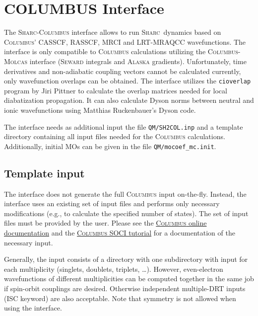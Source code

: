 \documentclass[a4paper,11pt,DIV=15,openany,twoside=false]{scrbook}
\newcommand{\sharc}{\textsc{Sharc}}
\newcommand{\ttt}[1]{\texttt{#1}}
\begin{document}

\section{COLUMBUS Interface}\label{sec:int:columbus}

The \sharc-\textsc{Columbus} interface allows to run \sharc\ dynamics based on \textsc{Columbus}' CASSCF, RASSCF, MRCI and LRT-MRAQCC wavefunctions. The interface is only compatible to \textsc{Columbus} calculations utilizing the \textsc{Columbus}-\textsc{Molcas} interface (\textsc{Seward} integrals and \textsc{Alaska} gradients). Unfortunately, time derivatives and non-adiabatic coupling vectors cannot be calculated currently, only wavefunction overlaps can be obtained. The interface utilizes the \ttt{cioverlap} program by Jiri Pittner \cite{Pittner2009CP} to calculate the overlap matrices needed for local diabatization propagation. It can also calculate Dyson norms between neutral and ionic wavefunctions using Matthias Ruckenbauer's Dyson code. 

The interface needs as additional input the file \ttt{QM/SH2COL.inp} and a template directory containing all input files needed for the \textsc{Columbus} calculations. Additionally, initial MOs can be given in the file \ttt{QM/mocoef\_mc.init}.

\subsection{Template input}

The interface does not generate the full \textsc{Columbus} input on-the-fly. Instead, the interface uses an existing set of input files and performs only necessary modifications (e.g., to calculate the specified number of states). The set of input files must be provided by the user. Please see the \href{http://www.univie.ac.at/columbus/docs_COL70/documentation_main.html}{\textsc{Columbus} online documentation} and the 
\href{http://www.univie.ac.at/columbus/docs_COL70/tutorial-SO.pdf}{\textsc{Columbus} SOCI tutorial} for a documentation of the necessary input.

Generally, the input consists of a directory with one subdirectory with input for each multiplicity (singlets, doublets, triplets, \dots). However, even-electron wavefunctions of different multiplicities can be computed together in the same job if spin-orbit couplings are desired. Otherwise independent multiple-DRT inputs (ISC keyword) are also acceptable. Note that symmetry is not allowed when using the interface.
\end{document}
